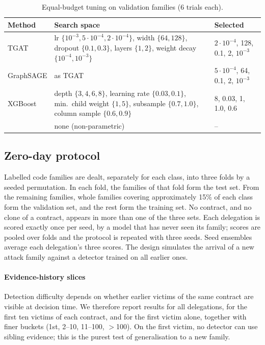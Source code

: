 \begin{table}[t]
\centering
\caption{Equal-budget tuning on validation families (6 trials each).}
\label{tab:tuning}
\footnotesize
\setlength{\tabcolsep}{3pt}
\begin{tabular}{lp{}p{}}
\toprule
Method & Search space & Selected \\
\midrule
TGAT & lr $\{10^{-3},5{\cdot}10^{-4},2{\cdot}10^{-4}\}$, width $\{64,128\}$, dropout $\{0.1,0.3\}$, layers $\{1,2\}$, weight decay $\{10^{-4},10^{-3}\}$ & $2{\cdot}10^{-4}$, 128, 0.1, 2, $10^{-3}$ \\
GraphSAGE & as TGAT & $5{\cdot}10^{-4}$, 64, 0.1, 2, $10^{-3}$ \\
XGBoost & depth $\{3,4,6,8\}$, learning rate $\{0.03,0.1\}$, min.\ child weight $\{1,5\}$, subsample $\{0.7,1.0\}$, column sample $\{0.6,0.9\}$ & 8, 0.03, 1, 1.0, 0.6 \\
\dn{} & none (non-parametric) & -- \\
\bottomrule
\end{tabular}
\end{table}

\subsection{Zero-day protocol}
Labelled code families are dealt, separately for each class, into three folds by a seeded permutation. In each fold, the families of that fold form the test set. From the remaining families, whole families covering approximately 15\% of each class form the validation set, and the rest form the training set. No contract, and no clone of a contract, appears in more than one of the three sets. Each delegation is scored exactly once per seed, by a model that has never seen its family; scores are pooled over folds and the protocol is repeated with three seeds. Seed ensembles average each delegation's three scores. The design simulates the arrival of a new attack family against a detector trained on all earlier ones.

\paragraph{Evidence-history slices} Detection difficulty depends on whether earlier victims of the same contract are visible at decision time. We therefore report results for all delegations, for the first ten victims of each contract, and for the first victim alone, together with finer buckets (1st, 2--10, 11--100, $>$100). On the first victim, no detector can use sibling evidence; this is the purest test of generalisation to a new family.

